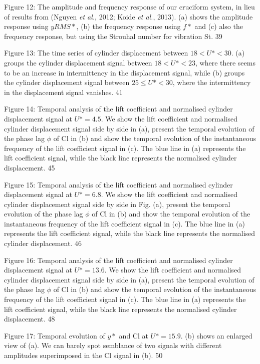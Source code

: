 \documentclass[]{article}
\begin{document}
Figure 12: The amplitude and frequency response of our cruciform system,
in lieu of results from (Nguyen \emph{et al.}, 2012; Koide \emph{et
al.}, 2013). (a) shows the amplitude response using \(yRMS*\), (b) the
frequency response using \(f*\) and (c) also the frequency response, but
using the Strouhal number for vibration St. 39

Figure 13: The time series of cylinder displacement between
\(18 < U* < 30\). (a) groups the cylinder displacement signal between
\(18 < U* < 23\), where there seems to be an increase in intermittency
in the displacement signal, while (b) groups the cylinder displacement
signal between \(25 \leq U* < 30\), where the intermittency in the
displacement signal vanishes. 41

Figure 14: Temporal analysis of the lift coefficient and normalised
cylinder displacement signal at \(U* = 4.5\). We show the lift
coefficient and normalised cylinder displacement signal side by side in
(a), present the temporal evolution of the phase lag \(\phi\) of Cl in
(b) and show the temporal evolution of the instantaneous frequency of
the lift coefficient signal in (c). The blue line in (a) represents the
lift coefficient signal, while the black line represents the normalised
cylinder displacement. 45

Figure 15: Temporal analysis of the lift coefficient and normalised
cylinder displacement signal at \(U* = 6.8\). We show the lift
coefficient and normalised cylinder displacement signal side by side in
Fig. (a), present the temporal evolution of the phase lag \(\phi\) of Cl
in (b) and show the temporal evolution of the instantaneous frequency of
the lift coefficient signal in (c). The blue line in (a) represents the
lift coefficient signal, while the black line represents the normalised
cylinder displacement. 46

Figure 16: Temporal analysis of the lift coefficient and normalised
cylinder displacement signal at \(U* = 13.6\). We show the lift
coefficient and normalised cylinder displacement signal side by side in
(a), present the temporal evolution of the phase lag \(\phi\) of Cl in
(b) and show the temporal evolution of the instantaneous frequency of
the lift coefficient signal in (c). The blue line in (a) represents the
lift coefficient signal, while the black line represents the normalised
cylinder displacement. 48

Figure 17: Temporal evolution of \(y*\) and Cl at \(U* = 15.9\). (b)
shows an enlarged view of (a). We can barely spot semblance of two
signals with different amplitudes superimposed in the Cl signal in (b).
50
\end{document}
